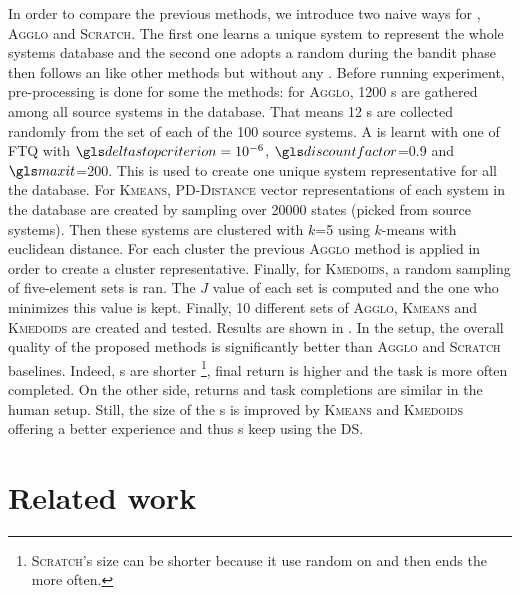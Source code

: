 In order to compare the previous methods, we introduce two naive ways for , \textsc{Agglo} and  \textsc{Scratch}. The first one learns a unique system to represent the whole systems database and the second one adopts a random  during the bandit phase then follows an   like other methods but without any .
%
Before running experiment, pre-processing is done for some the methods: for \textsc{Agglo}, 1200 s are gathered among all source systems in the database. That means 12 s are collected randomly from the  set of each of the 100 source systems. A  is learnt with one  of \gls{FTQ} with $\deltastoppingcriterion=10^{-6}$, $\discountfactor$=0.9 and $\maxiteration$=200. This  is used to create one unique system representative for all the database. For \textsc{Kmeans}, \textsc{PD-Distance} vector representations of each system in the database are created by sampling over 20000 states (picked from source systems). Then these systems are clustered with $k$=5 using $k$-means with euclidean distance. For each cluster the previous \textsc{Agglo} method is applied in order to create a cluster representative. Finally, for \textsc{Kmedoids}, a random sampling of five-element sets is ran. The $J$ value of each set is computed and the one who minimizes this value is kept. Finally, 10 different sets of \textsc{Agglo}, \textsc{Kmeans} and \textsc{Kmedoids} are created and tested. Results are shown in . In the  setup, the overall  quality of the proposed methods is significantly better than \textsc{Agglo} and \textsc{Scratch} baselines. Indeed, s are shorter \footnote{\textsc{Scratch}'s  size can be shorter because it use random  on  and then ends the  more often.}, final return is higher and the task is more often completed. On the other side, returns and task completions are similar in the human setup. Still, the size of the s is improved by \textsc{Kmeans} and \textsc{Kmedoids} offering a better  experience and thus s keep using the \gls{DS}.

\section{Related work}

